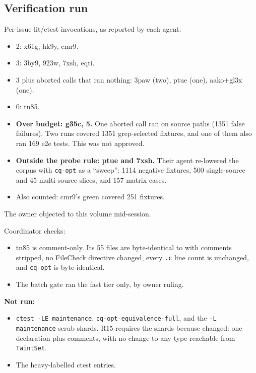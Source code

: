 \subsection*{Verification run}
Per-issue lit/ctest invocations, as reported by each agent:
\begin{itemize}
  \item 2: x61g, hk9y, cmr9.
  \item 3: 3by9, 923w, 7xsh, eqti.
  \item 3 plus aborted calls that ran nothing: 3paw (two), ptue (one), aako$+$gl3x (one).
  \item 0: tn85.
  \item \textbf{Over budget: g35c, 5.} One aborted call ran on source paths (1351 false
  failures). Two runs covered 1351 grep-selected fixtures, and one of them also ran 169 e2e
  tests. This was not approved.
  \item \textbf{Outside the probe rule: ptue and 7xsh.} Their agent re-lowered the corpus
  with \texttt{cq-opt} as a ``sweep'': 1114 negative fixtures, 500 single-source and 45
  multi-source slices, and 157 matrix cases.
  \item Also counted: cmr9's green covered 251 fixtures.
\end{itemize}
The owner objected to this volume mid-session.

Coordinator checks:
\begin{itemize}
  \item tn85 is comment-only. Its 55 files are byte-identical to  with
  comments stripped, no FileCheck directive changed, every \texttt{.c} line count is
  unchanged, and \texttt{cq-opt} is byte-identical.
  \item The batch gate ran the fast tier only, by owner ruling.
\end{itemize}

\textbf{Not run:}
\begin{itemize}
  \item \texttt{ctest -LE maintenance}, \texttt{cq-opt-equivalence-full}, and the
  \texttt{-L maintenance} scrub shards. R15 requires the shards because
   changed: one declaration plus comments, with no change to any
  type reachable from \texttt{TaintSet}.
  \item The heavy-labelled ctest entries.
\end{itemize}

